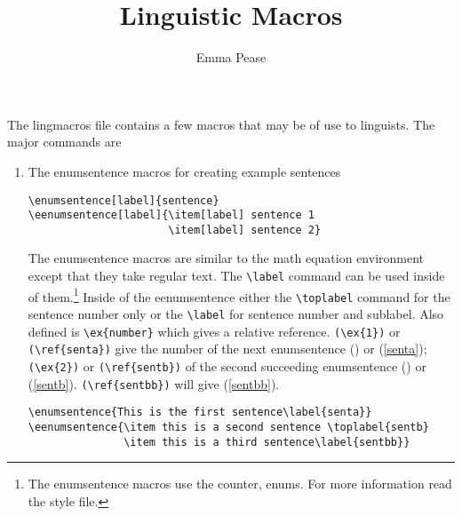
\title{Linguistic Macros}
\author{Emma Pease}



\maketitle

The lingmacros file contains a few macros that may be of use to
linguists.  The major commands are
\begin{enumerate}
\item The enumsentence macros for creating example sentences
\begin{center}
\begin{verbatim}
\enumsentence[label]{sentence}
\eenumsentence[label]{\item[label] sentence 1
                      \item[label] sentence 2}
\end{verbatim}
\end{center}
 The enumsentence macros are similar to the math equation environment
except that they take regular text.  The \verb+\label+ command can be
used inside of them.\footnote{The enumsentence macros use the counter,
enums.  For more information read the style file.} Inside of the
eenumsentence either the \verb+\toplabel+ command for the sentence
number only or the \verb+\label+ for sentence number and sublabel.
Also defined is
\verb+\ex{number}+ which gives a relative reference.  \verb+(\ex{1})+
or \verb+(\ref{senta})+ give the number of the next enumsentence ()
or (\ref{senta}); \verb+(\ex{2})+ or \verb+(\ref{sentb})+ of the second
succeeding enumsentence () or (\ref{sentb}).
\verb+(\ref{sentbb})+ will give (\ref{sentbb}).
\begin{center}
\begin{verbatim}
\enumsentence{This is the first sentence\label{senta}}
\eenumsentence{\item this is a second sentence \toplabel{sentb}
               \item this is a third sentence\label{sentbb}}
\end{verbatim}
\end{center}



\end{enumerate}

